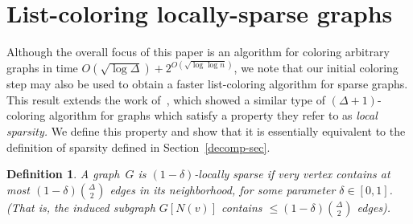 \documentclass[11pt]{amsart}
\newtheorem{definition}[theorem]{Definition}
\begin{document}
\iffalse
We have shown that after the $\lceil \sqrt{\ln \Delta} \rceil$ dense coloring steps, the number of dense neighbors of each dense vertex shrinks to $O(\log n)\cdot 2^{O(\sqrt{\log \Delta})}$. Also, for each sparse vertex~$x$, we have $Q_{\lceil \sqrt{\ln \Delta} \rceil}(x) \geq \deg_{\lceil \sqrt{\ln \Delta} \rceil}(x) + \Omega(\epsilon^2 \Delta)$ due to the initial coloring step. By applying the algorithm of Elkin, Pettie, and Su~\cite[Section 4]{elk15} on the sparse component, it can be colored in $O(\log(1/\epsilon)) + 2^{O(\sqrt{\log \log n})} = O(\sqrt{\log \Delta}) + 2^{O(\sqrt{\log \log n})}$ rounds. Then, we apply the algorithm of Barenboim et al.~\cite{BEPS16} to color the remaining vertices whose degrees are bounded by $\Delta' = O(\log n)\cdot 2^{O(\sqrt{\log \Delta})}$. It then runs in $O(\log \Delta') + 2^{O(\sqrt{\log \log n})} = O(\sqrt{\log \Delta}) +  2^{O(\sqrt{\log \log n})}$ rounds. The total number of rounds is $O(\sqrt{\log \Delta}) + 2^{O(\sqrt{\log \log n})}$.
\fi

\section{List-coloring locally-sparse graphs}
\label{list-color-locally-sparse-sec}
Although the overall focus of this paper is an algorithm for coloring arbitrary graphs in time $O(\sqrt{\log \Delta}) + 2^{O(\sqrt{\log \log n})}$, we note that our initial coloring step may also be used to obtain a faster list-coloring algorithm for sparse graphs. This result extends the work of~\cite{elk15}, which showed a similar type of $(\Delta+1)$-coloring algorithm for graphs which satisfy a property they refer to as \emph{local sparsity.} We define this property and show that it is essentially equivalent to the definition of sparsity defined in Section~\ref{decomp-sec}.
\begin{definition}
A graph~$G$ is \emph{$(1-\delta)$-locally sparse} if very vertex contains at most $(1-\delta) \binom{\Delta}{2}$ edges in its neighborhood, for some parameter $\delta \in [0,1]$. (That is, the induced subgraph $G[ N(v) ]$ contains $\leq (1 - \delta) \binom{\Delta}{2}$ edges).
\end{definition}
\end{document}
